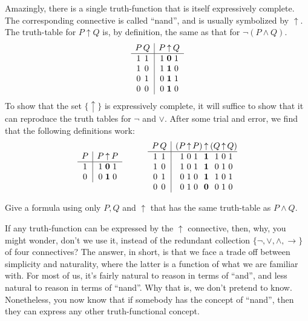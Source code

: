 Amazingly, there is a single truth-function that is itself
expressively complete.  The corresponding connective is called
``nand'', and is usually symbolized by $\uparrow$.  The truth-table
for $P \uparrow Q$ is, by definition, the same as that for
$\neg (P\wedge Q)$.
\[ \begin{array}{ c@{\, }c | c@{\, }c@{\, }c }
P & Q   & P & \uparrow & Q  \\  \hline
1 & 1   & 1 & \mathbf{0} & 1  \\
1 & 0   & 1 & \mathbf{1} & 0  \\
0 & 1   & 0 & \mathbf{1} & 1  \\
0 & 0   & 0 & \mathbf{1} & 0  \\
\end{array} \]
To show that the set $\{ \uparrow \}$ is expressively complete, it will suffice
to show that it can reproduce the truth tables for $\neg$ and $\vee$.
After some trial and error, we find that the following definitions work:
\[ \begin{array}{c c c c } \begin{array}{ c | c@{\, }c@{\, }c}
P & P & \uparrow & P  \\
\hline 
1 &   1 & \mathbf{0} & 1  \\
0 &   0 & \mathbf{1} & 0  \end{array} 
& & & \begin{array}{ c@{\, }c | c@{ }c@{\, }c@{\, }c@{ }c@{\, }c@{\, }c@{ }c@{\, }c@{\, }c@{ }c@{ }c@{ }c}
     P & Q &   ( & P & \uparrow & P & ) & \uparrow & ( & Q & \uparrow & Q & ) & \\
\hline 
1 & 1 &    & 1 & 0 & 1 &  & \mathbf{1} &  & 1 & 0 & 1 &  & \\
1 & 0 &    & 1 & 0 & 1 &  & \mathbf{1} &  & 0 & 1 & 0 &  & \\
0 & 1 &    & 0 & 1 & 0 &  & \mathbf{1} &  & 1 & 0 & 1 &  & \\
0 & 0 &    & 0 & 1 & 0 &  & \mathbf{0} &  & 0 & 1 & 0 &  & \\
      \end{array} \end{array} \]
  \begin{exercise} Give a formula using only $P,Q$ and $\uparrow$ that
    has the same truth-table as $P\wedge Q$. \end{exercise} If any
  truth-function can be expressed by the $\uparrow$ connective, then, why, you might wonder, don't we 
  use it, instead of the redundant collection $\{ \neg ,\vee ,\wedge
  ,\to \}$ of four connectives?  The answer, in short, is that we
  face a trade off between simplicity and naturality, where the latter
  is a function of what we are familiar with.  For most of us, it's
  fairly natural to reason in terms of ``and'', and less natural to
  reason in terms of ``nand''.  Why that is, we don't pretend to know.
  Nonetheless, you now know that if somebody has the concept of
  ``nand'', then they can express any other truth-functional concept.

